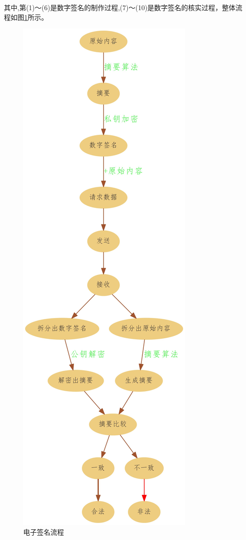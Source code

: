 \documentclass{book}
\begin{document}
其中,第(1)～(6)是数字签名的制作过程,(7)～(10)是数字签名的核实过程，整体流程如图\ref{fig:ElectronicSignWorkflow}所示。

\begin{figure}[htbp]
	\centering
	\includegraphics[scale=0.2]{ElectronicSignWorkflow.jpg}
	\caption{电子签名流程}
	\label{fig:ElectronicSignWorkflow}
\end{figure}
\end{document}
